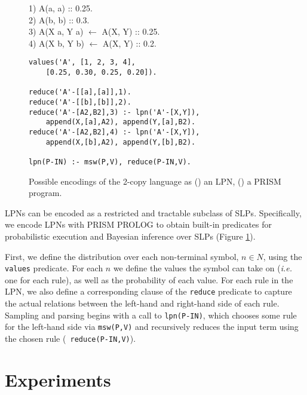 \documentclass[11pt, twocolumn]{article}
\begin{document}

\begin{figure}[t]
	\centering
	\begin{minipage}[b]{\linewidth}
1) A(a, a) :: 0.25. \\
2) A(b, b) :: 0.3. \\
3) A(X a, Y a) $\leftarrow$ A(X, Y) :: 0.25. \\
4) A(X b, Y b) $\leftarrow$ A(X, Y) :: 0.2.
		\subcaption{}
		\label{fig:grammar}
	\end{minipage}
	\begin{minipage}[b]{\linewidth}
		\begin{lstlisting}
values('A', [1, 2, 3, 4],
    [0.25, 0.30, 0.25, 0.20]).

reduce('A'-[[a],[a]],1).
reduce('A'-[[b],[b]],2).
reduce('A'-[A2,B2],3) :- lpn('A'-[X,Y]),
    append(X,[a],A2), append(Y,[a],B2).
reduce('A'-[A2,B2],4) :- lpn('A'-[X,Y]),
    append(X,[b],A2), append(Y,[b],B2).

lpn(P-IN) :- msw(P,V), reduce(P-IN,V).
		\end{lstlisting}
		\subcaption{}
		\label{fig:prism}
	\end{minipage}
	\caption{Possible encodings of the 2-copy language as () an LPN, () a PRISM program.}
	\label{fig:copy}
\end{figure}

LPNs can be encoded as a restricted and tractable subclass of
SLPs. Specifically, we encode LPNs with PRISM PROLOG to obtain
built-in predicates for probabilistic execution and Bayesian inference
over SLPs (Figure \ref{fig:copy}).

First, we define the distribution over each non-terminal symbol, $n
\in N$, using the {\tt values} predicate. For each $n$ we define the
values the symbol can take on ({\it i.e.} one for each rule), as well
as the probability of each value. For each rule in the LPN, we also
define a corresponding clause of the {\tt reduce} predicate to capture
the actual relations between the left-hand and right-hand side of each
rule. Sampling and parsing begins with a call to {\tt lpn(P-IN)},
which chooses some rule for the left-hand side via {\tt msw(P,V)} and
recursively reduces the input term using the chosen rule ({\tt
reduce(P-IN,V)}).

\section{Experiments}
\end{document}
